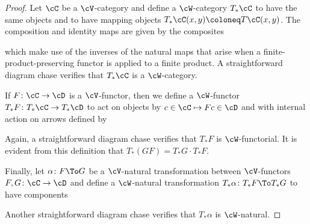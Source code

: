 \begin{proof}
    Let $\cC$ be a $\cV$-category and define a $\cW$-category $T_*\cC$ to have the same objects and to have mapping objects $T_*\cC(x,y) \coloneq T\cC(x,y)$. The composition and identity maps are given by the composites
\begin{center}
\end{center}
which make use of the inverses of the natural maps that arise when a finite-product-preserving functor is applied to a finite product. A straightforward diagram chase verifies that $T_*\cC$ is a $\cW$-category.

If $F \colon \cC \to \cD$ is a $\cV$-functor, then we define a $\cW$-functor $T_*F \colon T_*\cC \to T_*\cD$ to act on objects by $c \in\cC \mapsto Fc \in \cD$ and with internal action on arrows defined by
\begin{center} 
\end{center}
Again, a straightforward diagram chase verifies that $T_*F$ is $\cW$-functorial. It is evident from this definition that $T_*(GF) = T_*G \cdot T_*F$.

Finally, let $\alpha \colon F \To G$ be a $\cV$-natural transformation between $\cV$-functors $F,G \colon \cC\to \cD$ and define a $\cW$-natural transformation $T_*\alpha \colon T_* F \To T_*G$ to have components
\begin{center}
\end{center}
Another straightforward diagram chase verifies that $T_*\alpha$ is $\cW$-natural.


\end{proof}
